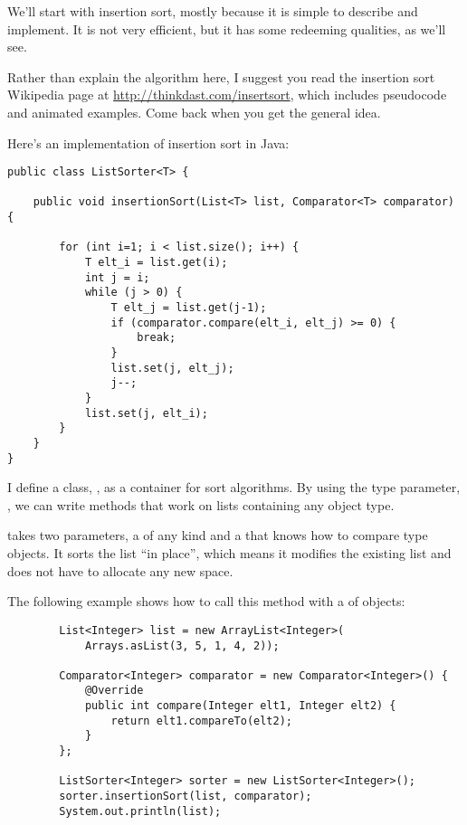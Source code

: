 \documentclass[12pt]{book}
\theoremstyle{exercise}
\begin{document}
We'll start with insertion sort, mostly because it is simple to describe
and implement. It is not very efficient, but it has some redeeming
qualities, as we'll see.


Rather than explain the algorithm here, I suggest you read the
insertion sort Wikipedia page at
\url{http://thinkdast.com/insertsort}, which includes
pseudocode and animated examples. Come back when you get the general
idea.

Here's an implementation of insertion sort in Java:

\begin{verbatim}
public class ListSorter<T> {

    public void insertionSort(List<T> list, Comparator<T> comparator) {

        for (int i=1; i < list.size(); i++) {
            T elt_i = list.get(i);
            int j = i;
            while (j > 0) {
                T elt_j = list.get(j-1);
                if (comparator.compare(elt_i, elt_j) >= 0) {
                    break;
                }
                list.set(j, elt_j);
                j--;
            }
            list.set(j, elt_i);
        }
    }
}
\end{verbatim}

I define a class, , as a container for sort
algorithms. By using the type parameter, , we can write
methods that work on lists containing any object type.


 takes two parameters, a  of any kind
and a  that knows how to compare type 
objects. It sorts the list ``in place'', which means it modifies the
existing list and does not have to allocate any new space.


The following example shows how to call this method with a  of
 objects:

\begin{verbatim}
        List<Integer> list = new ArrayList<Integer>(
            Arrays.asList(3, 5, 1, 4, 2));

        Comparator<Integer> comparator = new Comparator<Integer>() {
            @Override
            public int compare(Integer elt1, Integer elt2) {
                return elt1.compareTo(elt2);
            }
        };

        ListSorter<Integer> sorter = new ListSorter<Integer>();
        sorter.insertionSort(list, comparator);
        System.out.println(list);
\end{verbatim}
\end{document}
